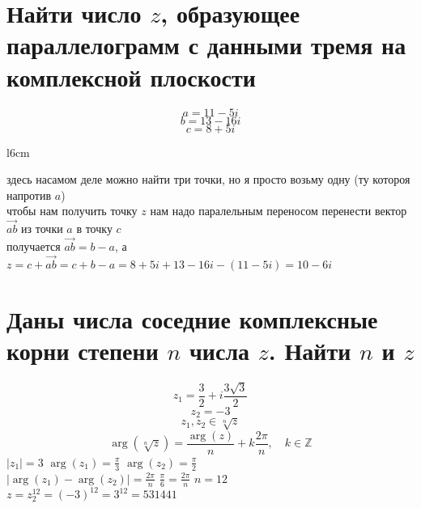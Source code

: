 \documentclass{article}
\renewcommand{\vec}{\overrightarrow}
\newcommand{\ds}{\displaystyle}
\newcommand{\abs}[1]{\left|#1\right|}
\newcommand{\Arg}[1]{\arg\left(#1\right)}
\begin{document}
  \section{Найти число $z$, образующее параллелограмм с данными тремя на комплексной плоскости}
  $$ a = 11-5i $$
  $$ b = 13-16i $$
  $$ c = 8+5i $$
  \begin{wrapfigure}{l}{6cm}
    \vspace{-2.5cm}
    \centering
    \vspace{-.5cm}
  \end{wrapfigure}

  \noindent здесь насамом деле можно найти три точки, но я просто возьму одну (ту котороя напротив $a$) \\
  чтобы нам получить точку $z$ нам надо паралельным переносом перенести вектор $\vec{ab}$ из точки $a$ в точку $c$ \\
  получается $\vec{ab} = b - a$, а $z = c + \vec{ab} = c+b-a = 8+5i + 13-16i - (11-5i) = 10-6i$ \\

  \section{Даны числа соседние комплексные корни степени $n$ числа $z$. Найти $n$ и $z$}
  $$ z_1 = \frac{3}{2} + i\frac{3\sqrt{3}}{2} $$
  $$ z_2 = -3 $$
  $$ z_1,z_2 \in \sqrt[n]{z} $$
  $$ \Arg{\sqrt[n]{z}} = \frac{\Arg{z}}{n} + k\frac{2\pi}{n},\quad k\in\mathbb{Z} $$
  $\ds \abs{z_1} = 3$ \quad $\ds \Arg{z_1} = \frac{\pi}{3}$ \quad $\ds \Arg{z_2} = \frac{\pi}{2}$ \\
  $\ds \abs{\Arg{z_1} - \Arg{z_2}} = \frac{2\pi}{n}$ \quad $\ds \frac{\pi}{6} = \frac{2\pi}{n}$ \quad $\ds n = 12$ \\
  $\ds z = z_2^{12} = (-3)^{12} = 3^{12} = 531441$
\end{document}
